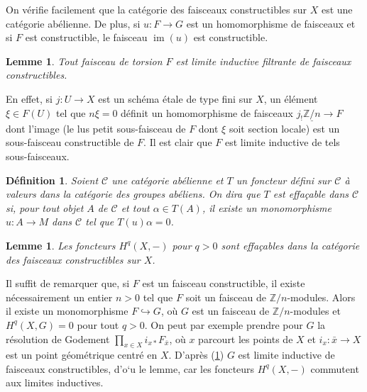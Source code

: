 \documentclass{article}
\DeclareMathOperator{\im}{im}
\newcommand{\const}[1]{\underline{#1}}
\newcommand{\cC}{\mathcal{C}}
\newcommand{\dZ}{\mathbb{Z}}
\newtheorem{definition}[subsubsection]{Définition}
\newtheorem{lemma}[subsubsection]{Lemme}
\begin{document}
On vérifie facilement que la catégorie des faisceaux constructibles sur $X$ 
est une catégorie abélienne. De plus, si $u:F\to G$ est un homomorphisme de 
faisceaux et si $F$ est constructible, le faisceau $\im(u)$ est constructible.





\begin{lemma}\label{4-3-3}
Tout faisceau de torsion $F$ est limite inductive filtrante de faisceaux 
constructibles.
\end{lemma}

En effet, si $j:U\to X$ est un schéma étale de type fini sur $X$, un 
élément $\xi\in F(U)$ tel que $n\xi=0$ définit un homomorphisme de 
faisceaux $j_! \const{\dZ/n}\to F$ dont l'image (le lus petit sous-faisceau de 
$F$ dont $\xi$ soit section locale) est un sous-faisceau constructible de $F$. 
Il est clair que $F$ est limite inductive de tels sous-faisceaux.





\begin{definition}\label{4-3-4}
Soient $\cC$ une catégorie abélienne et $T$ un foncteur défini sur $\cC$ 
à valeurs dans la catégorie des groupes abéliens. On dira que $T$ est 
\emph{effaçable} dans $\cC$ si, pour tout objet $A$ de $\cC$ et tout 
$\alpha\in T(A)$, il existe un monomorphisme $u:A\to M$ dans $\cC$ tel que 
$T(u)\alpha = 0$. 
\end{definition}





\begin{lemma}\label{4-3-5}
Les foncteurs $H^q(X,-)$ pour $q>0$ sont effaçables dans la catégorie des 
faisceaux constructibles sur $X$.
\end{lemma}

Il suffit de remarquer que, si $F$ est un faisceau constructible, il existe 
nécessairement un entier $n>0$ tel que $F$ soit un faisceau de 
$\dZ/n$-modules. Alors il existe un monomorphisme $F\hookrightarrow G$, où 
$G$ est un faisceau de $\dZ/n$-modules et $H^q(X,G) = 0$ pour tout $q>0$. On 
peut par exemple prendre pour $G$ la résolution de Godement 
$\prod_{x\in X} i_{x*} F_{\bar x}$, où $x$ parcourt les points de $X$ et 
$i_x:\bar x\to X$ est un point géométrique centré en $X$. D'après 
(\ref{4-3-3}) $G$ est limite inductive de faisceaux constructibles, d'o`u le 
lemme, car les foncteurs $H^q(X,-)$ commutent aux limites inductives. 
\end{document}
